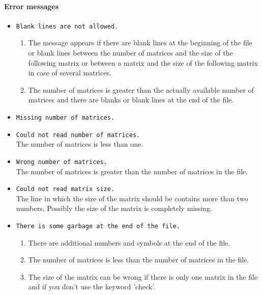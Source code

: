 \paragraph{Error messages}
\begin{itemize}
  \item \texttt{Blank lines are not allowed.}
        \begin{enumerate}
          \item The message appears if there are blank lines at the
                beginning of the file or blank lines between the
                number of matrices and the size of the following
                matrix or between a matrix and the size of the
                following matrix in case of several matrices.
          \item The number of matrices is greater than the actually
                available number of matrices and there are blanks or
                blank lines at the end of the file.
        \end{enumerate}
  \item \texttt{Missing number of matrices.}
  \item \texttt{Could not read number of matrices.} \\
        The number of matrices is less than one.
  \item \texttt{Wrong number of matrices.} \\
        The number of matrices is greater than the number of matrices
        in the file.
  \item \texttt{Could not read matrix size.} \\
        The line in which the size of the matrix should be contains
        more than two numbers. Possibly the size of the matrix is
        completely missing.
  \item \texttt{There is some garbage at the end of the file.}
        \begin{enumerate}
          \item There are additional numbers and symbols at the end of
                the file.
          \item The number of matrices is less than the number of
                matrices in the file.
          \item The size of the matrix can be wrong if there is only
                one matrix in the file and if you don't use the keyword
                'check'.
        \end{enumerate}
\end{itemize}

